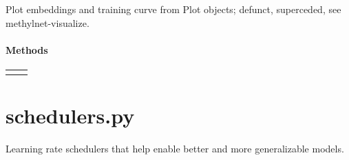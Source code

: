 \documentclass[letterpaper,10pt,english]{sphinxmanual}
\begin{document}

\begin{fulllineitems}
\label{\detokenize{index:methylnet.plotter.Plotter}}
Plot embeddings and training curve from Plot objects; defunct, superceded, see methylnet-visualize.
\subsubsection*{Methods}


\begin{savenotes}\sphinxattablestart
\centering
\begin{tabulary}{\linewidth}[t]{|T|T|}
\hline

&\\
\hline
{}
&\\
\hline
\end{tabulary}
\par
\sphinxattableend\end{savenotes}

\end{fulllineitems}

\label{\detokenize{index:module-methylnet.schedulers}}

\chapter{schedulers.py}
\label{\detokenize{index:schedulers-py}}
Learning rate schedulers that help enable better and more generalizable models.
\end{document}
